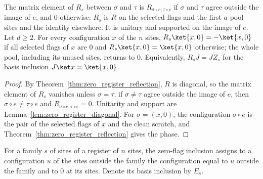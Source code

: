 \begin{theorem}
    \label{thm:zero_register_selected_reflection}
    \leanok
    The matrix element of $R_s$ between $\sigma$ and $\tau$ is $R_{\sigma\circ e,\tau\circ e}$
    if $\sigma$ and $\tau$ agree outside the image of $e$, and $0$ otherwise: $R_s$ is $R$ on
    the selected flags and the first $a$ pool sites and the identity elsewhere. It is unitary
    and supported on the image of $e$. Let $d\geq2$. For every configuration $x$ of the $n$
    sites, $R_s\ket{x,0}=-\ket{x,0}$ if all selected flags of $x$ are $0$ and
    $R_s\ket{x,0}=\ket{x,0}$ otherwise; the whole pool, including its unused sites, returns to
    $0$. Equivalently, $R_sJ=JZ_s$ for the basis inclusion $J\ket x=\ket{x,0}$.
\end{theorem}
\begin{proof}\leanok
    By Theorem~\ref{thm:zero_register_reflection}, $R$ is diagonal, so the matrix element of
    $R_s$ vanishes unless $\sigma=\tau$; if $\sigma\neq\tau$ agree outside the image of $e$,
    then $\sigma\circ e\neq\tau\circ e$ and $R_{\sigma\circ e,\tau\circ e}=0$. Unitarity and
    support are Lemma~\ref{lem:zero_register_diagonal}. For $\sigma=(x,0)$, the configuration
    $\sigma\circ e$ is the pair of the selected flags of $x$ and the clean scratch, and
    Theorem~\ref{thm:zero_register_reflection} gives the phase.
\end{proof}

\begin{definition}
    \label{def:zero_register_flag_inclusion}
    \leanok
    For a family $s$ of sites of a register of $n$ sites, the zero-flag inclusion assigns to
    a configuration $u$ of the sites outside the family the configuration equal to $u$ outside
    the family and to $0$ at its sites. Denote its basis inclusion by $E_s$.
\end{definition}

